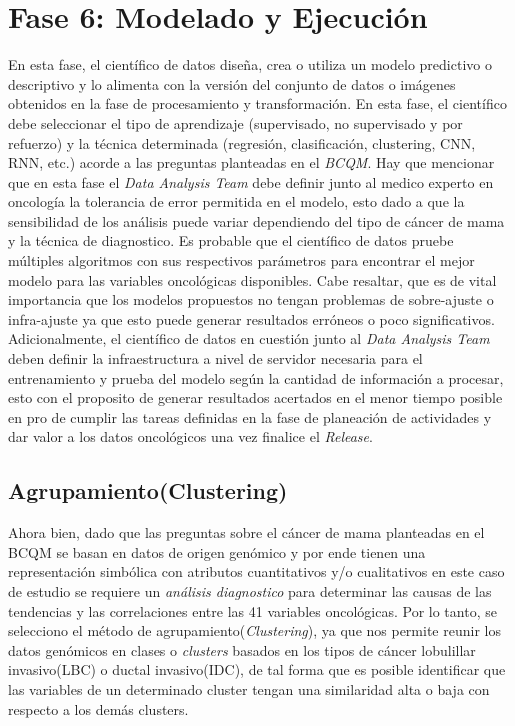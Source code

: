 \clearpage
\section{Fase 6: Modelado y Ejecución}
En esta fase, el científico de datos diseña, crea o utiliza un modelo predictivo o descriptivo y lo alimenta con la versión del conjunto de datos o imágenes obtenidos en la fase de procesamiento y transformación. En esta fase, el científico debe seleccionar el tipo de aprendizaje (supervisado, no supervisado y por refuerzo) y la técnica determinada (regresión, clasificación, clustering, CNN, RNN, etc.) acorde a las preguntas planteadas en el \textit{BCQM}. Hay que mencionar que en esta fase el \textit{Data Analysis Team} debe definir junto al medico experto en oncología la tolerancia de error permitida en el modelo, esto dado a que la sensibilidad de los análisis puede variar dependiendo del tipo de cáncer de mama y la técnica de diagnostico. Es probable que el científico de datos pruebe múltiples algoritmos con sus respectivos parámetros para encontrar el mejor modelo para las variables oncológicas disponibles. Cabe resaltar, que es de vital importancia que los modelos propuestos no tengan problemas de sobre-ajuste o infra-ajuste ya que esto puede generar resultados erróneos o poco significativos. Adicionalmente, el científico de datos en cuestión junto al \textit{Data Analysis Team} deben definir la infraestructura a nivel de servidor necesaria para el entrenamiento y prueba del modelo según la cantidad de información a procesar, esto con el proposito de generar resultados acertados en el menor tiempo posible en pro de cumplir las tareas definidas en la fase de planeación de actividades y dar valor a los datos oncológicos una vez finalice el \textit{Release}.

\subsection{Agrupamiento(Clustering)}
Ahora bien, dado que las preguntas sobre el cáncer de mama planteadas en el BCQM se basan en datos de origen genómico y por ende tienen una representación simbólica con atributos cuantitativos y/o cualitativos en este caso de estudio se requiere un \textit{análisis diagnostico} para determinar las causas de las tendencias y las correlaciones entre las 41 variables oncológicas. Por lo tanto, se selecciono el  método de agrupamiento(\textit{Clustering}), ya que nos permite reunir los datos genómicos en clases o \textit{clusters} basados en los tipos de cáncer lobulillar invasivo(LBC) o ductal invasivo(IDC), de tal forma que es posible identificar que las variables de un determinado cluster tengan una similaridad alta o baja con respecto a los demás clusters.

